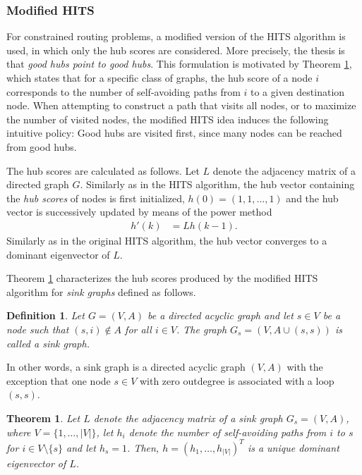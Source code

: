 \documentclass[dissertation,draft*]{aaltoseries}
\newtheorem{theorem}{Theorem}
\newtheorem*{definition}{Definition}
\begin{document}
\subsubsection{Modified HITS}
\label{modifiedhits}
For constrained routing problems, a modified version of the HITS algorithm is used, in which only the hub scores
are considered. More precisely, the thesis is that \emph{good hubs point to good hubs}. 
This formulation is motivated by Theorem \ref{polut}, which states that for a specific class of graphs,
the hub score of a node $i$ corresponds to the number of self-avoiding paths
from $i$ to a given destination node.
When attempting to construct a path that visits all nodes, or to maximize the number of visited nodes, 
the modified HITS idea induces the following intuitive policy: 
Good hubs are visited first, since many nodes can be reached from good hubs. 

The hub scores are calculated as follows.
Let $L$ denote the adjacency matrix of a directed graph $G$. 
Similarly as in the HITS algorithm, the hub vector containing the \emph{hub scores} of nodes is first initialized, $h(0) = (1,1,\ldots,1)$ 
and the hub vector is successively updated by means of the power method
\begin{align}
\label{modhub}
h'(k) & = L h(k-1).
\end{align}
Similarly as in the original HITS algorithm, the hub vector
converges to a dominant eigenvector of $L$.

Theorem \ref{polut} characterizes the hub scores produced by the modified HITS algorithm for 
\emph{sink graphs} defined as follows.
\begin{definition}
\label{sinkg}
Let $G=(V,A)$ be a directed acyclic graph and let $s \in V$ be a node such that $(s,i) \notin A$ for all $i \in V$.
The graph $G_s=(V, A \cup (s,s))$ is called a \emph{sink graph}. 
\end{definition}
In other words, a sink graph is a directed acyclic graph $(V,A)$ with the exception that one node $s \in V$ with zero outdegree is
associated with a loop $(s,s)$.

\begin{theorem}
\label{polut}
Let $L$ denote the adjacency matrix of a sink graph $G_s=(V,A)$, where $V=\{1,\ldots,|V|\}$,  
let $h_i$ denote the number of self-avoiding paths from $i$ to $s$ for $i \in V \setminus \{s\}$ and let $h_s=1$. 
Then, $h=(h_1,\ldots,h_{|V|})^T$ is a unique dominant eigenvector of $L$.
\end{theorem}
\end{document}

